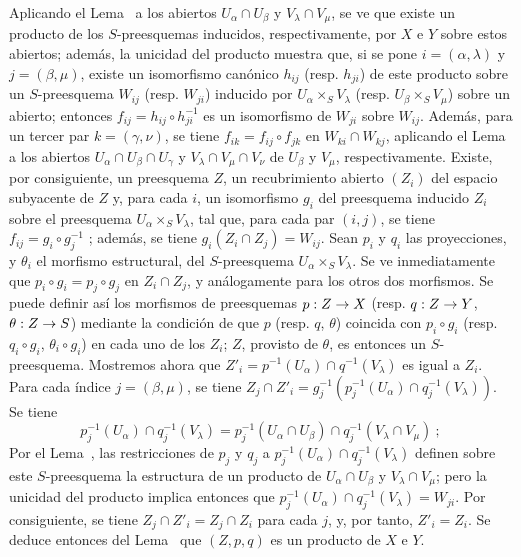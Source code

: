 \documentclass[oneside]{amsart}
\theoremstyle{ega-env-style}
\theoremstyle{ega-thm-env-style}
\theoremstyle{ega-defn-env-style}
\renewcommand{\to}{\mathchoice{\longrightarrow}{\rightarrow}{\rightarrow}{\rightarrow}}
\begin{document}
Aplicando el Lema~ a los abiertos $U_\alpha\cap U_\beta$ y
$V_\lambda\cap V_\mu$, se ve que existe un producto de los $S$-preesquemas inducidos,
respectivamente, por $X$ e $Y$ sobre estos abiertos; además, la unicidad del producto
muestra que, si se pone $i=(\alpha,\lambda)$ y $j=(\beta,\mu)$, existe un isomorfismo
canónico $h_{ij}$ (resp. $h_{ji}$) de este producto sobre un $S$-preesquema $W_{ij}$
(resp. $W_{ji}$) inducido por $U_\alpha\times_S V_\lambda$ (resp. $U_\beta\times_S V_\mu$) sobre
un abierto; entonces $f_{ij}=h_{ij}\circ h_{ji}^{-1}$ es un isomorfismo de $W_{ji}$ sobre
$W_{ij}$. Además, para un tercer par $k=(\gamma,\nu)$, se tiene
$f_{ik}=f_{ij}\circ f_{jk}$ en
$W_{ki}\cap W_{kj}$, aplicando el Lema  a
los abiertos $U_\alpha\cap U_\beta\cap U_\gamma$ y $V_\lambda\cap V_\mu\cap V_\nu$ de
$U_\beta$ y $V_\mu$, respectivamente. Existe, por consiguiente, un preesquema $Z$, un recubrimiento
abierto $(Z_i)$ del espacio subyacente de $Z$ y, para cada $i$, un isomorfismo $g_i$ del
preesquema inducido
$Z_i$ sobre el preesquema $U_\alpha\times_S V_\lambda$, tal que, para cada par $(i,j)$, se tiene
$f_{ij}=g_i\circ g_j^{-1}$ ; además, se tiene $g_i(Z_i\cap Z_j)=W_{ij}$.
Sean $p_i$ y $q_i$ las proyecciones, y $\theta_i$ el morfismo estructural, del
$S$-preesquema $U_\alpha\times_S V_\lambda$. Se ve inmediatamente que
$p_i\circ g_i=p_j\circ g_j$ en $Z_i\cap Z_j$, y análogamente para los otros dos morfismos. Se puede
definir así los morfismos de preesquemas $p:Z\to X$ (resp. $q:Z\to Y$, $\theta:Z\to S$) mediante
la condición de que $p$ (resp. $q$, $\theta$) coincida con $p_i\circ g_i$
(resp. $q_i\circ g_i$, $\theta_i\circ g_i$) en cada uno de los $Z_i$; $Z$, provisto de
$\theta$, es entonces un $S$-preesquema. Mostremos ahora que
$Z'_i=p^{-1}(U_\alpha)\cap q^{-1}(V_\lambda)$ es igual a $Z_i$. Para cada índice
$j=(\beta,\mu)$, se tiene $Z_j\cap Z'_i=g_j^{-1}(p_j^{-1}(U_\alpha)\cap q_j^{-1}(V_\lambda))$.
Se tiene
\[
  p_j^{-1}(U_\alpha)\cap q_j^{-1}(V_\lambda)
  =p_j^{-1}(U_\alpha\cap U_\beta)\cap
   q_j^{-1}(V_\lambda\cap V_\mu)~;
\]
Por el Lema~, las restricciones de $p_j$ y $q_j$ a
$p_j^{-1}(U_\alpha)\cap q_j^{-1}(V_\lambda)$ definen sobre este $S$-preesquema la estructura de un
producto de $U_\alpha\cap U_\beta$ y $V_\lambda\cap V_\mu$; pero la unicidad del
producto implica entonces que $p_j^{-1}(U_\alpha)\cap q_j^{-1}(V_\lambda)=W_{ji}$. Por consiguiente, se
tiene $Z_j\cap Z'_i=Z_j\cap Z_i$ para cada $j$, y, por tanto, $Z'_i=Z_i$. Se deduce entonces del
Lema~ que $(Z,p,q)$ es un producto de $X$ e $Y$.
\end{document}
